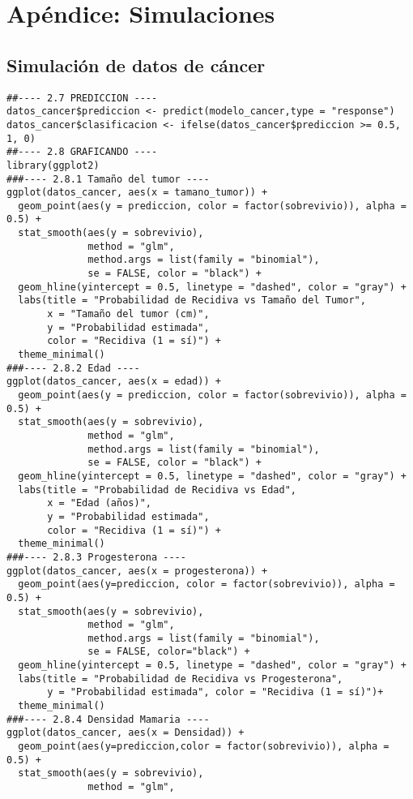 \documentclass[12pt]{article}
\begin{document}
\section*{Apéndice: Simulaciones}

\subsection*{Simulación de datos de cáncer}
\begin{verbatim}
##---- 2.7 PREDICCION ----
datos_cancer$prediccion <- predict(modelo_cancer,type = "response")
datos_cancer$clasificacion <- ifelse(datos_cancer$prediccion >= 0.5, 1, 0)
##---- 2.8 GRAFICANDO ----
library(ggplot2)
###---- 2.8.1 Tamaño del tumor ----
ggplot(datos_cancer, aes(x = tamano_tumor)) +
  geom_point(aes(y = prediccion, color = factor(sobrevivio)), alpha = 0.5) +    
  stat_smooth(aes(y = sobrevivio), 
              method = "glm", 
              method.args = list(family = "binomial"), 
              se = FALSE, color = "black") +  
  geom_hline(yintercept = 0.5, linetype = "dashed", color = "gray") +
  labs(title = "Probabilidad de Recidiva vs Tamaño del Tumor",
       x = "Tamaño del tumor (cm)",
       y = "Probabilidad estimada",
       color = "Recidiva (1 = sí)") +
  theme_minimal()
###---- 2.8.2 Edad ----
ggplot(datos_cancer, aes(x = edad)) +
  geom_point(aes(y = prediccion, color = factor(sobrevivio)), alpha = 0.5) +
  stat_smooth(aes(y = sobrevivio),
              method = "glm",
              method.args = list(family = "binomial"), 
              se = FALSE, color = "black") +  
  geom_hline(yintercept = 0.5, linetype = "dashed", color = "gray") +
  labs(title = "Probabilidad de Recidiva vs Edad",
       x = "Edad (años)",
       y = "Probabilidad estimada",
       color = "Recidiva (1 = sí)") + 
  theme_minimal()
###---- 2.8.3 Progesterona ----
ggplot(datos_cancer, aes(x = progesterona)) +
  geom_point(aes(y=prediccion, color = factor(sobrevivio)), alpha = 0.5) +     
  stat_smooth(aes(y = sobrevivio),
              method = "glm",
              method.args = list(family = "binomial"), 
              se = FALSE, color="black") +  
  geom_hline(yintercept = 0.5, linetype = "dashed", color = "gray") +
  labs(title = "Probabilidad de Recidiva vs Progesterona",
       y = "Probabilidad estimada", color = "Recidiva (1 = sí)")+ 
  theme_minimal()
###---- 2.8.4 Densidad Mamaria ----
ggplot(datos_cancer, aes(x = Densidad)) +
  geom_point(aes(y=prediccion,color = factor(sobrevivio)), alpha = 0.5) +     
  stat_smooth(aes(y = sobrevivio),
              method = "glm",

\end{verbatim}
\end{document}
